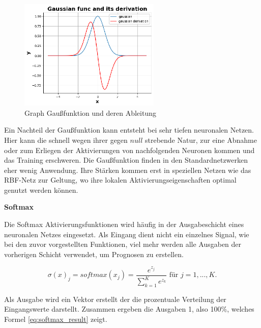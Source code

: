 \begin{figure}[!ht]
	\includegraphics[width=0.6\textwidth]{content/chapter_basics/plots/gaussian_func_plot.eps}
	\centering
	\caption{Graph Gaußfunktion und deren Ableitung}
	\label{img:gaussian_func_graph}
\end{figure}

Ein Nachteil der Gaußfunktion kann entsteht bei sehr tiefen neuronalen Netzen. Hier kann die schnell wegen ihrer gegen $null$ strebende Natur, zur eine Abnahme oder zum Erliegen der Aktivierungen von nachfolgenden Neuronen kommen und das Training erschweren. Die Gaußfunktion finden in den Standardnetzwerken eher wenig Anwendung. Ihre Stärken kommen erst in speziellen Netzen wie das RBF-Netz zur Geltung, wo ihre lokalen Aktivierungseigenschaften optimal genutzt werden können.\vspace{0.2cm}

%
\textbf{Softmax}\vspace{0.2cm}


Die Softmax Aktivierungsfunktionen wird häufig in der Ausgabeschicht eines neuronalen Netzes eingesetzt. Als Eingang dient nicht ein einzelnes Signal, wie bei den zuvor vorgestellten Funktionen, viel mehr werden alle Ausgaben der vorherigen Schicht verwendet, um Prognosen zu erstellen.

\begin{equation}\label{eq:softmax_function}
	\sigma (x)_{j} = softmax(x_{j}) = \frac{e^{z_{j}}}{\sum_{k=1}^{K} e^{z_{k}}} \text{ für } j = 1, ..., K.
\end{equation}

Als Ausgabe wird ein Vektor erstellt der die prozentuale Verteilung der Eingangswerte darstellt. Zusammen ergeben die Ausgaben 1, also 100\%, welches Formel \ref{eq:softmax_result} zeigt.

